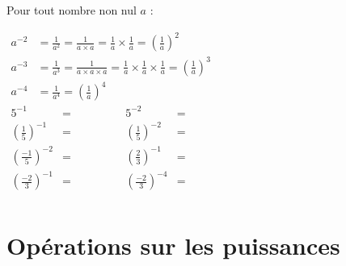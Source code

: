 \documentclass[main.tex]{subfiles}
\begin{document}
\begin{example}
	Pour tout nombre non nul $a$ : 
	
	$\begin{aligned}
		a^{-2} & = \frac{1}{a^2} =\frac{1}{a\times a}=\frac{1}{a}\times \frac{1}{a} = \left(\frac{1}{a}\right)^2 \\ 
		a^{-3} & =\frac{1}{a^3}=\frac{1}{a\times a \times a} =\frac{1}{a}\times \frac{1}{a}\times \frac{1}{a} = \left(\frac{1}{a}\right)^3\\ 
		a^{-4} & =\frac{1}{a^4}   = \left(\frac{1}{a}\right)^4 
	\end{aligned}$ \\
 $\begin{aligned}
		5^{-1}& =\qquad \qquad  &
		5^{-2}& = \\
		\left(\frac{1}{5}\right)^{-1}&= &
		\left(\frac{1}{5}\right)^{-2}&= \\  
		\left(\frac{-1}{5}\right)^{-2}&= &
		\left(\frac{2}{3}\right)^{-1}&= \\
		\left(\frac{-2}{3}\right)^{-1}&= &
		\left(\frac{-2}{3}\right)^{-4}&= \\
	\end{aligned}$ 
\end{example} 


% 

\newpage 
{}  
\pagestyle{scrheadings} %
\onehalfspacing  



\section{Opérations sur les puissances}
\end{document}
